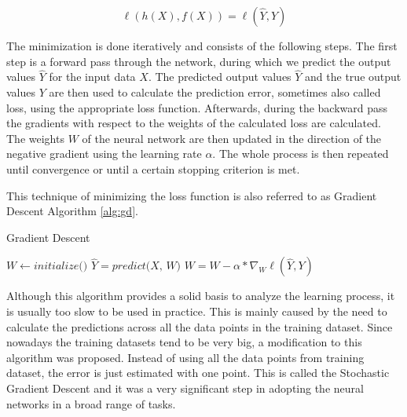 \begin{equation}
    \ell(h(X), f(X)) = \ell(\hat{Y}, Y)
    \label{eq:loss}
\end{equation}

The minimization is done iteratively and consists of the following steps.
The first step is a forward pass through the network, during which we predict the output values $\hat{Y}$ for the input data $X$.
The predicted output values $\hat{Y}$ and the true output values $Y$ are then used to calculate the prediction error, sometimes also called loss, using the appropriate loss function.
Afterwards, during the backward pass the gradients with respect to the weights of the calculated loss are calculated.
The weights $W$ of the neural network are then updated in the direction of the negative gradient using the learning rate $\alpha$.
The whole process is then repeated until convergence or until a certain stopping criterion is met.

This technique of minimizing the loss function is also referred to as Gradient Descent Algorithm \ref{alg:gd}.

\begin{algorithm}
    \caption{Gradient Descent}
        \label{alg:gd}
        \begin{algorithmic}[1]
            \State $W \gets \textit{initialize()}$
            \Repeat
                \State $\hat{Y} = \textit{predict(X, W)}$
                \State $W = W - \alpha * \nabla_W \ell(\hat{Y}, Y)$
        \end{algorithmic}
\end{algorithm}

Although this algorithm provides a solid basis to analyze the learning process, it is usually too slow to be used in practice.
This is mainly caused by the need to calculate the predictions across all the data points in the training dataset.
Since nowadays the training datasets tend to be very big, a modification to this algorithm was proposed.
Instead of using all the data points from training dataset, the error is just estimated with one point.
This is called the Stochastic Gradient Descent and it was a very significant step in adopting the neural networks in a broad range of tasks.

